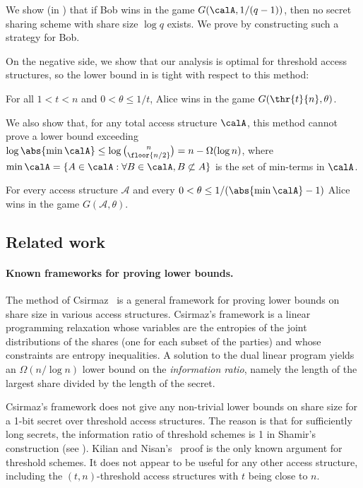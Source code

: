 \documentclass{toc}
\begin{document}
We show (in ) that if Bob wins in the game $G(\calA, 1/(q-1))$, then no secret sharing scheme with share size $\log q$ exists.  We prove  by constructing such a strategy for Bob.

On the negative side, we show that our analysis is optimal for threshold access structures, so the lower bound in  is tight with respect to this method:

\begin{theorem}	\label{thm:limitation}
For all $1 < t < n$ and $0 < \theta \leq 1/t$,  Alice wins in the game $G(\thr{t}{n}, \theta)$.
\end{theorem}

We also show that, for any total access structure $\calA$, this method cannot prove a lower bound exceeding 
$\log\abs{\min\calA}\leq \log \binom{n}{\floor{n/2}} = n-\Omega(\log{n})$, 
where $\min\calA=\{A\in\calA:\forall B\in\calA, B\not\subset A\}$ is the set of min-terms in $\calA$. 

\begin{theorem}	\label{thm:limitation1}
For every access structure $\mathcal{A}$ and every 
$0 < \theta \leq 1/(\abs{\min\calA} - 1)$ 
Alice wins in the game $G(\mathcal{A}, \theta)$. 
\end{theorem}


\subsection{Related work}
\paragraph{Known frameworks for proving lower bounds.}
The method of Csirmaz~\cite{Csirmaz97} is a 
general framework for proving lower bounds on share size in various access
structures.
Csirmaz's framework is a linear programming relaxation whose variables are the entropies of the joint distributions of the shares (one for each subset of the parties) and whose constraints are entropy inequalities.  A solution to the dual linear program yields an $\Omega(n/\log n)$ lower bound on the \emph{information ratio}, namely the length of the largest share divided by the length of the secret.

Csirmaz's framework does not give any non-trivial lower bounds on
share size for a 1-bit secret over threshold access
structures.  The reason is that for sufficiently long secrets, the information ratio of threshold schemes is 1 in Shamir's construction (see ).  Kilian and
Nisan's~\cite{KilianN90} proof is the only known argument for threshold schemes.
It does not appear to be useful for any other access structure, including the
$(t,n)$-threshold access structures with $t$ being close to $n$.
\end{document}
